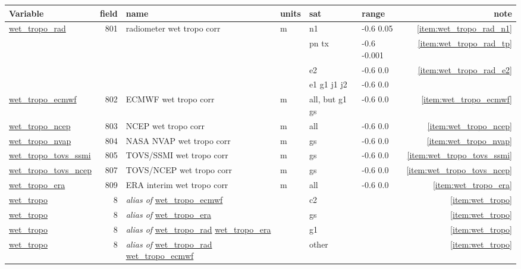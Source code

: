 \documentclass[a4paper,11pt,openany,natbib]{thesis}
\makeatletter
\newcommand\var[1]{\url{#1}\index{variables!#1@\protect\url{#1}}}
\newcommand\alias[1]{\emph{alias of} \var{#1}}
\newenvironment{vartable}{
\begin{table}[ht]
\small
\begin{tabular}{lrllllr}
\hline
Variable & field & name & units & sat & range & note \\
\hline
}{
\hline
\end{tabular}
\end{table}
}
\makeatother
\begin{document}
\begin{vartable}
\var{wet_tropo_rad} & 801 & radiometer wet tropo corr & m & n1 & -0.6 0.05 & \ref{item:wet_tropo_rad_n1} \\
                    &     &                           &   & pn tx & -0.6 -0.001 & \ref{item:wet_tropo_rad_tp} \\
                    &     &                           &   & e2 & -0.6 0.0 & \ref{item:wet_tropo_rad_e2} \\
                    &     &                           &   & e1 g1 j1 j2 & -0.6 0.0 & \\
\var{wet_tropo_ecmwf} & 802 & ECMWF wet tropo corr    & m & all, but g1 gs & -0.6 0.0 & \ref{item:wet_tropo_ecmwf} \\ 
\var{wet_tropo_ncep} & 803 & NCEP wet tropo corr      & m & all & -0.6 0.0 & \ref{item:wet_tropo_ncep} \\
\var{wet_tropo_nvap} & 804 & NASA NVAP wet tropo corr & m & gs & -0.6 0.0 & \ref{item:wet_tropo_nvap} \\
\var{wet_tropo_tovs_ssmi} & 805 & TOVS/SSMI wet tropo corr & m & gs & -0.6 0.0 & \ref{item:wet_tropo_tovs_ssmi} \\
\var{wet_tropo_tovs_ncep} & 807 & TOVS/NCEP wet tropo corr & m & gs & -0.6 0.0 & \ref{item:wet_tropo_tovs_ncep} \\
\var{wet_tropo_era} & 809 & ERA interim wet tropo corr & m & all & -0.6 0.0 & \ref{item:wet_tropo_era} \\
\hline
\var{wet_tropo} & 8 & \alias{wet_tropo_ecmwf} & & c2 & & \ref{item:wet_tropo} \\
\var{wet_tropo} & 8 & \alias{wet_tropo_era} & & gs & & \ref{item:wet_tropo} \\
\var{wet_tropo} & 8 & \alias{wet_tropo_rad} \var{wet_tropo_era} & & g1 & & \ref{item:wet_tropo} \\
\var{wet_tropo} & 8 & \alias{wet_tropo_rad} \var{wet_tropo_ecmwf} & & other & & \ref{item:wet_tropo} \\
\end{vartable}
\end{document}
